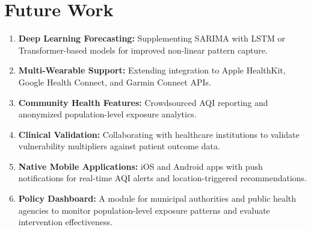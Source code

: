 \documentclass[12pt,a4paper]{report}
\begin{document}
\section{Future Work}

\begin{enumerate}[leftmargin=*]
  \item \textbf{Deep Learning Forecasting:} Supplementing SARIMA with LSTM or Transformer-based models for improved non-linear pattern capture.
  \item \textbf{Multi-Wearable Support:} Extending integration to Apple HealthKit, Google Health Connect, and Garmin Connect APIs.
  \item \textbf{Community Health Features:} Crowdsourced AQI reporting and anonymized population-level exposure analytics.
  \item \textbf{Clinical Validation:} Collaborating with healthcare institutions to validate vulnerability multipliers against patient outcome data.
  \item \textbf{Native Mobile Applications:} iOS and Android apps with push notifications for real-time AQI alerts and location-triggered recommendations.
  \item \textbf{Policy Dashboard:} A module for municipal authorities and public health agencies to monitor population-level exposure patterns and evaluate intervention effectiveness.
\end{enumerate}
\end{document}
